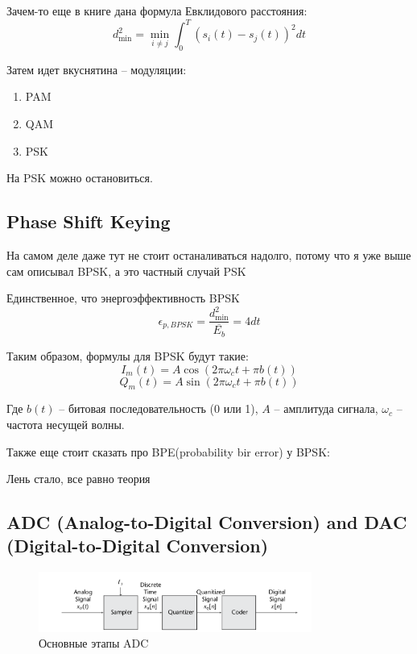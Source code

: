 \documentclass[14pt, report]{extarticle}
\begin{document}
Зачем-то еще в книге дана формула Евклидового расстояния:
\[
d_{\min}^2 = \min_{i \not = j} \int_0^T(s_i(t) - s_j(t))^2 dt
\]

Затем идет вкуснятина -- модуляции:
\begin{enumerate}
  \item PAM
  \item QAM
  \item PSK
\end{enumerate}

На PSK можно остановиться.
\subsection{Phase Shift Keying}

\par На самом деле даже тут не стоит останаливаться надолго, 
потому что я уже выше сам описывал BPSK, а это частный случай PSK

\par Единственное, что энергоэффективность BPSK
\[
\epsilon_{p, BPSK} = \frac{d_{\min}^2 }{\overline{E_b}} = 4 dt
\]


\par Таким образом, формулы для BPSK будут такие:
\[ I_m(t) = A \cos(2 \pi \omega_c t + \pi b(t)) \]
\[ Q_m(t) = A \sin(2 \pi \omega_c t + \pi b(t)) \]

Где \( b(t) \) -- битовая последовательность (0 или 1),
\( A \) -- амплитуда сигнала, \( \omega_c \) -- частота несущей волны.

\par Также еще стоит сказать про BPE(probability bir error) у BPSK:
\par Лень стало, все равно теория

\subsection{ADC (Analog-to-Digital Conversion) and DAC (Digital-to-Digital Conversion)}

\begin{figure}[h]
  \centering
  \includegraphics[width=0.8\textwidth]{../adc.png}
  \caption{Основные этапы ADC}
\end{figure}
\end{document}
